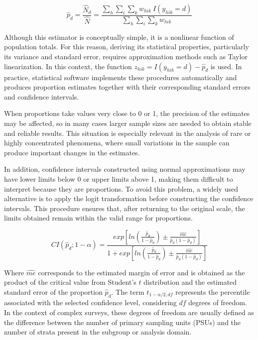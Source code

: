 \documentclass[
  english,
  12pt,
]{book}
\begin{document}
\[
\hat{p}_d = \frac{\hat{N}_d}{\hat{N}} = \frac{\displaystyle\sum_{h} \sum_{i} \sum_{k} w_{hik} \ I(y_{hik}=d)} {\displaystyle\sum_{h} \sum_{i} \sum_{k} w_{hik}}
\]

Although this estimator is conceptually simple, it is a nonlinear function of population totals. For this reason, deriving its statistical properties, particularly its variance and standard error, requires approximation methods such as Taylor linearization. In this context, the function \(z_{hik}=I(y_{hik}=d)-\hat{p}_d\) is used. In practice, statistical software implements these procedures automatically and produces proportion estimates together with their corresponding standard errors and confidence intervals.

When proportions take values very close to 0 or 1, the precision of the estimates may be affected, so in many cases larger sample sizes are needed to obtain stable and reliable results. This situation is especially relevant in the analysis of rare or highly concentrated phenomena, where small variations in the sample can produce important changes in the estimates.

In addition, confidence intervals constructed using normal approximations may have lower limits below 0 or upper limits above 1, making them difficult to interpret because they are proportions. To avoid this problem, a widely used alternative is to apply the logit transformation before constructing the confidence intervals. This procedure ensures that, after returning to the original scale, the limits obtained remain within the valid range for proportions.

\[
CI(\hat{p}_d; 1-\alpha) = \frac{exp \left[ln\left(\frac{\hat{p}_d}{1-\hat{p}_d}\right) \pm \frac{\widehat{me}}{\hat{p}_d(1-\hat{p}_d)}\right]}{1 + exp \left[ln\left(\frac{\hat{p}_d}{1-\hat{p}_d}\right) \pm \frac{\widehat{me}}{\hat{p}_d(1-\hat{p}_d)}\right]}
\]

Where \(\widehat{me}\) corresponds to the estimated margin of error and is obtained as the product of the critical value from Student's \(t\) distribution and the estimated standard error of the proportion \(\hat{p}_d\). The term \(t_{1-\alpha/2, df}\) represents the percentile associated with the selected confidence level, considering \(df\) degrees of freedom. In the context of complex surveys, these degrees of freedom are usually defined as the difference between the number of primary sampling units (PSUs) and the number of strata present in the subgroup or analysis domain.
\end{document}

